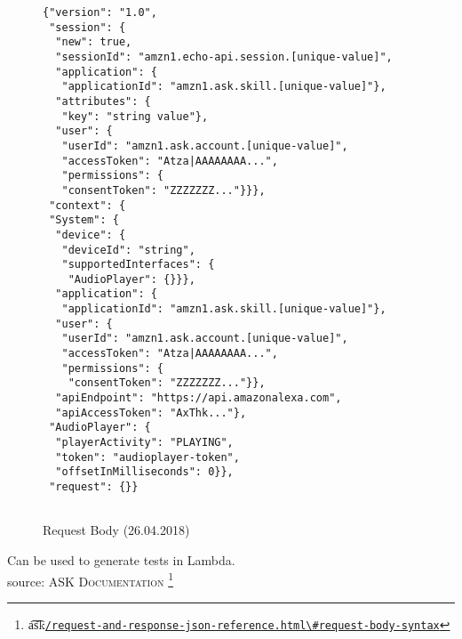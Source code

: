\begin{figure}[H]
	\caption[HTTPS Request Body Syntax]{Request Body (26.04.2018) }
	\label{jsonFromAlexa}

\begin{verbatim}
{"version": "1.0",
 "session": {
  "new": true,
  "sessionId": "amzn1.echo-api.session.[unique-value]",
  "application": {
   "applicationId": "amzn1.ask.skill.[unique-value]"},
  "attributes": {
   "key": "string value"},
  "user": {
   "userId": "amzn1.ask.account.[unique-value]",
   "accessToken": "Atza|AAAAAAAA...",
   "permissions": {
   "consentToken": "ZZZZZZZ..."}}},
 "context": {
 "System": {
  "device": {
   "deviceId": "string",
   "supportedInterfaces": {
    "AudioPlayer": {}}},
  "application": {
   "applicationId": "amzn1.ask.skill.[unique-value]"},
  "user": {
   "userId": "amzn1.ask.account.[unique-value]",
   "accessToken": "Atza|AAAAAAAA...",
   "permissions": {
    "consentToken": "ZZZZZZZ..."}},
  "apiEndpoint": "https://api.amazonalexa.com",
  "apiAccessToken": "AxThk..."},
 "AudioPlayer": {
  "playerActivity": "PLAYING",
  "token": "audioplayer-token",
  "offsetInMilliseconds": 0}},
 "request": {}}
	
	\end{verbatim}
\end{figure}

Can be used to generate tests in Lambda.\\
source: \textsc{ASK Documentation} \footnote{\t{a\t{sk}}\href{https://developer.amazon.com/docs/custom-skills}{\lstinline|/request-and-response-json-reference.html\#request-body-syntax|}}




{}
